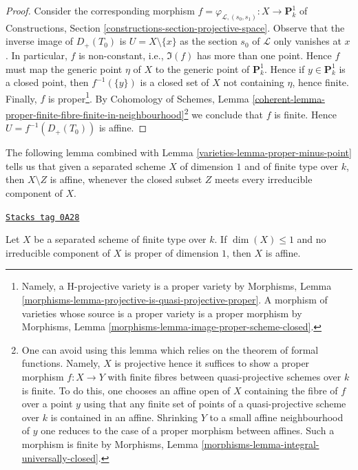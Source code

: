 \begin{proof}
\medskip\noindent
Consider the corresponding morphism
$f = \varphi_{\mathcal{L}, (s_0, s_1)} : X \to \mathbf{P}^1_k$
of Constructions, Section \ref{constructions-section-projective-space}.
Observe that the inverse image of $D_{+}(T_0)$ is $U = X \setminus \{x\}$
as the section $s_0$ of $\mathcal{L}$ only vanishes at $x$.
In particular, $f$ is non-constant, i.e., $\Im(f)$ has more
than one point. Hence $f$ must map the generic
point $\eta$ of $X$ to the generic point of $\mathbf{P}^1_k$.
Hence if $y \in \mathbf{P}^1_k$ is a closed point, then $f^{-1}(\{y\})$
is a closed set of $X$ not containing $\eta$, hence finite.
Finally, $f$ is proper\footnote{Namely, a H-projective variety
is a proper variety by Morphisms, Lemma
\ref{morphisms-lemma-projective-is-quasi-projective-proper}.
A morphism of varieties whose source is a proper variety is a proper morphism
by Morphisms, Lemma \ref{morphisms-lemma-image-proper-scheme-closed}.}.
By Cohomology of Schemes, Lemma
\ref{coherent-lemma-proper-finite-fibre-finite-in-neighbourhood}\footnote{One
can avoid using this lemma which relies on the theorem of formal
functions. Namely, $X$ is projective hence it suffices to show
a proper morphism $f : X \to Y$ with finite fibres between quasi-projective
schemes over $k$ is finite. To do this, one chooses an affine open of $X$
containing the fibre of $f$ over a point $y$ using that any finite set of
points of a quasi-projective scheme over $k$ is contained in an affine.
Shrinking $Y$ to a small affine neighbourhood of $y$ one reduces to the
case of a proper morphism between affines. Such a morphism is finite by
Morphisms, Lemma \ref{morphisms-lemma-integral-universally-closed}.}
we conclude that $f$ is finite. Hence $U = f^{-1}(D_{+}(T_0))$
is affine.
\end{proof}

The following lemma combined with Lemma \ref{varieties-lemma-proper-minus-point}
tells us that given a separated scheme $X$ of dimension $1$ and
of finite type over $k$, then $X \setminus Z$ is affine, whenever the
closed subset $Z$ meets every irreducible component of $X$.

\begin{lemma}
\label{varieties-lemma-dim-1-nonproper-affine}
\href{https://stacks.math.columbia.edu/tag/0A28}{\texttt{Stacks tag 0A28}}

Let $X$ be a separated scheme of finite type over $k$.
If $\dim(X) \leq 1$ and no irreducible component of $X$
is proper of dimension $1$, then $X$ is affine.
\end{lemma}

